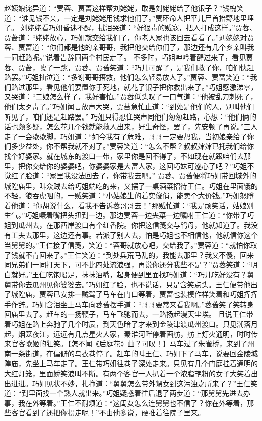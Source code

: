 \documentclass[12pt,oneside]{book}
\begin{document}
赵姨娘诧异道：“贾蓉、贾蔷这样帮刘姥姥，敢是刘姥姥给了他银子？”钱槐笑道：“谁见钱不亲，一定是刘姥姥用钱求他们了。”贾环命人把平儿尸首抬野地里埋了。
刘姥姥看巧姐昏迷不醒，拭泪哭道：“好狠毒的贼寇，把人打成这样。”贾蓉、贾蔷道：“姥姥放心，巧姐就交给我们了，你老人家也该回去看看了。”刘姥姥对贾蓉、贾蔷道：“你们都是他的亲哥哥，我把他交给你们了，那边还有几个乡亲叫我一同赶路呢。”说着告辞同两个村民走了。
不多时，巧姐呻吟着醒过来了，看见贾蓉、贾蔷，唬了一跳，贾蓉、贾蔷笑道：“巧儿可醒了，是我们救了你，咱们快赶路罢。”巧姐抽泣道：“多谢哥哥搭救，他们怎么轻易放人了。”贾蓉、贾蔷笑道：“我们路过那里，看见他们要置你于死地，就花了银子把你救出来了。”巧姐感激涕零，又哭道：“二娘怎么样了，我好害怕。”贾蓉低头叹了一口气道：“他被乱刀刺死了，他们太歹毒了。”巧姐闻言放声大哭，贾蔷急忙止道：“到处是他们的人，别叫他们听见了，咱们还是赶路罢。”
巧姐只得忍住哭声同他们匆匆赶路，心想：“他们俩的话也颇多疑，怎么花几个钱就能救人出来，好生奇怪，罢了，先安顿了再说。”三人走了一会歇歇脚，巧姐道：“如今我有了危难，哥哥一定要帮我，当初娘亲给了你们多少益处，你不帮我就不对了。”贾蓉笑道：“怎么不帮？叔叔婶婶已托我们给你找个好婆家。就在城东的渡口一带，家里你是回不得了，不如现在就跟咱们去那里，把你交给你的婆婆吧，你婆婆家是大富人家，这回巧妹可遂心了吧？”巧姐不觉红了脸道：“家里我没法回去了，你带我去吧。”
贾蓉、贾蔷便将巧姐带回城外的城隍庙里，叫众贼去给巧姐端吃的来，又摆了一桌酒菜招待王仁。巧姐在里面饿的不轻，狼吞虎咽的，一贼笑道：“小姑娘生的着实俊俏，能卖个大价钱。”巧姐怒瞪着他道：“你胡说什么，看我不告诉蓉哥哥去！”那贼忙道：“我是顽笑话，姑娘别生气。”巧姐噘着嘴把头扭到一边。那边贾蓉一边夹菜一边嘱咐王仁道：“你带了巧姐到瓜州去，在那西岸渡口有个红香院。你把这信笺交与鸨母，他就知道了。我没有工夫去那里，这边还有事。若派了别人去，怕是巧姐也不相信他，他就信你这个当舅舅的。”王仁接了信笺，笑道：“蓉哥就放心吧，交给我了。”贾蓉道：“就怕你取了钱就不肯回来了。”王仁笑道：“到处兵荒马乱的，我能去那里？我又不傻，回来同兄弟们一同打天下，可不比四处流浪强，再说你还分我些不是？”贾蓉笑道：“明白就好。”王仁吃饱喝足，抹抹油嘴，起身便到里面找巧姐道：“巧儿吃好没有？舅舅带你去瓜州见你婆婆去。”巧姐红了脸，也不说话，只是含笑点头。王仁便带他出了城隍庙，贾蓉已安排一贼驾了马车在门口等着，贾蔷也装模作样笑着和巧姐挥挥手作辞。巧姐含泪坐上马车向蓉蔷摆手道：“哥哥要常来看我啊。”蓉蔷笑了笑转身回庙里去了。赶车的一扬鞭子，马车飞驰而去，一路扬起漫天尘埃。
且说王仁带着巧姐在路上奔驰了几个时辰，到天色暗了才来到金陵津渡瓜州渡口。只见潮落月起，烟笼夜江，远远有几点星火人家，秦淮河畔停着画舫，舫上灯火通明，时时传来官客歌姬的狂笑。【怎不闻《后庭花》曲？可叹！】马车过了朱雀桥，来到了州南一条街道，在偏僻的乌衣巷停了。赶车的叫王仁、巧姐下了马车，说要回金陵城隍庙，先坐上马车走了。王仁带巧姐往巷子深处走来。只见有几个门庭挂着通明的大红灯笼，里面娇笑浪叫不断。有两个客官一人扒着一个浓脂艳粉的女子大笑着出出进进。巧姐见状不妙，扎挣道：“舅舅怎么带外甥女到这污浊之所来了？”王仁笑道：“到里面找一个熟人就出来。”巧姐疑惑着往后退了两步道：“那舅舅先进去办事，我在外等着。”王仁不耐烦道：“这闺女怎么连舅舅也不信了？你在外等着，那些客官看到了还把你拐走呢！”不由他多说，硬推着往院子里来。
\end{document}
